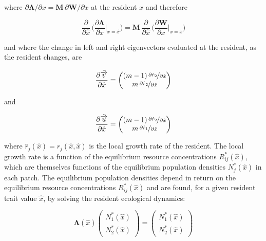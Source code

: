 where $\partial \pmb \Lambda / \partial x = \pmb M \, \partial \pmb W / \partial x$ at the resident $\hat x$ and therefore

\begin{equation}
    \frac{\partial}{\partial \hat x}\,\bigg(\frac{\partial \pmb \Lambda}{\partial x}\bigg|_{x=\hat x}\bigg) = \pmb M \, \frac{\partial}{\partial \hat x}\,\bigg(\frac{\partial \pmb W}{\partial x}\bigg|_{x=\hat x}\bigg)
\end{equation}

and where the change in left and right eigenvectors evaluated at the resident, as the resident changes, are

\begin{equation}
    \frac{\partial \hat{\overrightarrow{v}} }{\partial \hat x} = 
    \begin{pmatrix}
        (m-1)\,\nicefrac{\partial \hat r_2}{\partial \hat x}\\
        m\,\nicefrac{\partial \hat r_2}{\partial \hat x}
    \end{pmatrix}
    \label{eq:deriv_left_eigenvector_resident}
\end{equation}

and

\begin{equation}
    \frac{\partial \hat{\overrightarrow{u}} }{\partial \hat x} = 
    \begin{pmatrix}
        (m-1)\,\nicefrac{\partial \hat r_2}{\partial \hat x}\\
        m\,\nicefrac{\partial \hat r_1}{\partial \hat x}
    \end{pmatrix}
    \label{eq:deriv_right_eigenvector_resident}
\end{equation}

where $\hat r_j(\hat x) = r_j(\hat x, \hat x)$ is the local growth rate of the resident. The local growth rate is a function of the equilibrium resource concentrations $R^*_{ij}(\hat x)$, which are themselves functions of the equilibrium population densities $N^*_j(\hat x)$ in each patch. The equilibrium population densities depend in return on the equilibrium resource concentrations $R^*_{ij}(\hat x)$ and are found, for a given resident trait value $\hat x$, by solving the resident ecological dynamics:

\begin{equation}
    \pmb \Lambda(\hat x)
    \begin{pmatrix}
        N^*_1(\hat x)\\
        N^*_2(\hat x)
    \end{pmatrix}
    =
    \begin{pmatrix}
        N^*_1(\hat x)\\
        N^*_2(\hat x) 
    \end{pmatrix}
\end{equation}

